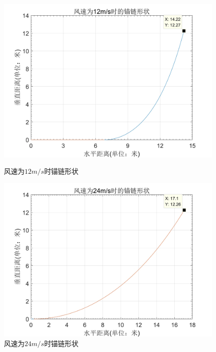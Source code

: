 \documentclass{cumcm}
\begin{document}
\begin{figure}[H]
  \begin{minipage}[t]{0.5\linewidth}   
    \centering   
    \includegraphics[width=\textwidth]{img/12mschainfigure.jpg}   
    \caption{风速为$12m/s$时锚链形状}   
    \label{fig:chain_shape_12ms}   
  \end{minipage}
   \begin{minipage}[t]{0.5\linewidth} %
      \centering   
      \includegraphics[width=\textwidth]{img/24mschainfigure.jpg}   
      \caption{风速为$24m/s$时锚链形状}   
      \label{fig:chain_shape_24ms}   
    \end{minipage} 
\end{figure}
\end{document}
